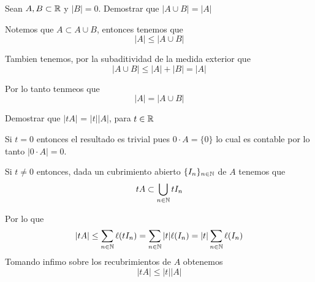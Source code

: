 \documentclass[../main.tex]{subfiles}
\begin{document}
\begin{problem}
Sean $A, B \subset \mathbb{R}$ y $|B| = 0$. Demostrar que $|A \cup B| = |A|$
\end{problem}
\begin{solution}
  Notemos que $A \subset A \cup B$, entonces tenemos que
  \begin{equation*}
    |A| \leq |A \cup B|
  \end{equation*}

  Tambien tenemos, por la subaditividad de la medida exterior que
  \begin{equation*}
    |A \cup B| \leq |A| + |B| = |A|
  \end{equation*}

  Por lo tanto tenmeos que
  \begin{equation*}
    |A| = |A \cup B|
  \end{equation*}
\end{solution}

\begin{problem}
Demostrar que $|tA|$ = $|t||A|$, para $t \in \mathbb{R}$
\end{problem}
\begin{solution}
  Si $t = 0$ entonces el resultado es trivial pues $0 \cdot A = \{0\}$ lo cual es contable por lo tanto $|0 \cdot A| = 0$.

  Si $t \neq 0$ entonces, dada un cubrimiento abierto $\{I_{n}\}_{n \in \mathbb{N}}$ de $A$ tenemos que
  \begin{equation*}
    tA \subset \bigcup_{n \in \mathbb{N}} tI_{n}
  \end{equation*}

  Por lo que
  \begin{equation*}
    |tA| \leq \sum_{n \in \mathbb{N}} \ell(tI_{n}) = \sum_{n \in \mathbb{N}} |t|\ell(I_{n}) =|t| \sum_{n \in \mathbb{N}}\ell(I_{n})
  \end{equation*}
  Tomando infimo sobre los recubrimientos de $A$ obtenemos
  \begin{equation*}
    |tA| \leq |t||A|
  \end{equation*}
\end{solution}
\end{document}
